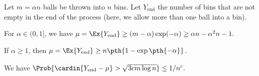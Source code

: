 \newcommand{\Yend}{Y_{\mathrm{end}}}%
\begin{lemma}
    Let $m = \alpha n$ balls be thrown into $n$ bins.  Let $\Yend$ the
    number of bins that are not empty in the end of the process (here,
    we allow more than one ball into a bin).
    \begin{compactenumA}
        \item For $\alpha \in (0,1]$, we have
        \begin{math}
            \mu%
            =%
            \Ex{\Yend}%
            \geq %
            (m-\alpha) \exp( -\alpha)%
            \geq%
            \alpha n - \alpha^2 n - 1.
        \end{math}
        
        \item  If $\alpha \geq 1$, then
        $\mu = \Ex{\Yend} \geq n\pth{ 1-\exp\pth{ -\alpha }}$.

        \item We have
        \begin{math}
            \Bigl.  \Prob{\bigl.\cardin{\Yend - \mu} > \smash{\sqrt{3
                     c m \log n}}} %
            \leq%
            1/n^c.
        \end{math}
    \end{compactenumA}
\end{lemma}
